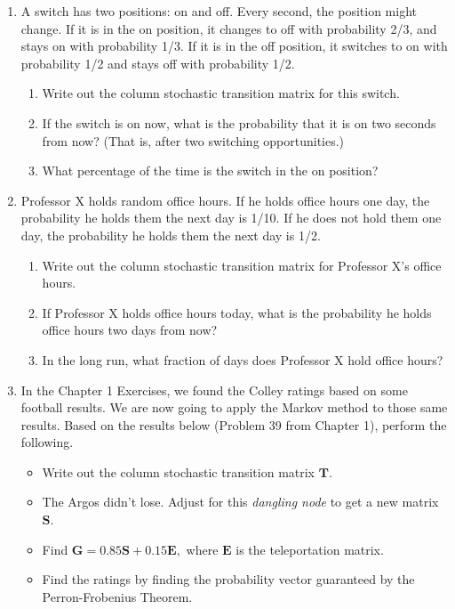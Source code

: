 \documentclass[
]{book}
\providecommand{\tightlist}{%
  \setlength{\itemsep}{0pt}\setlength{\parskip}{0pt}}
\theoremstyle{definition}
\theoremstyle{definition}
\theoremstyle{definition}
\theoremstyle{definition}
\theoremstyle{remark}
\begin{document}
\begin{enumerate}
\def\labelenumi{\arabic{enumi}.}
\setcounter{enumi}{26}
\tightlist
\item
  A switch has two positions: on and off. Every second, the position might change. If it is in the on position, it changes to off with probability 2/3, and stays on with probability 1/3. If it is in the off position, it switches to on with probability 1/2 and stays off with probability 1/2.

  \begin{enumerate}
  \def\labelenumii{\alph{enumii}.}
  \tightlist
  \item
    Write out the column stochastic transition matrix for this switch.
  \item
    If the switch is on now, what is the probability that it is on two seconds from now? (That is, after two switching opportunities.)
  \item
    What percentage of the time is the switch in the on position?
  \end{enumerate}
\item
  Professor X holds random office hours. If he holds office hours one day, the probability he holds them the next day is 1/10. If he does not hold them one day, the probability he holds them the next day is 1/2.

  \begin{enumerate}
  \def\labelenumii{\alph{enumii}.}
  \tightlist
  \item
    Write out the column stochastic transition matrix for Professor X's office hours.
  \item
    If Professor X holds office hours today, what is the probability he holds office hours two days from now?
  \item
    In the long run, what fraction of days does Professor X hold office hours?
  \end{enumerate}
\item
  In the Chapter 1 Exercises, we found the Colley ratings based on some football results. We are now going to apply the Markov method to those same results. Based on the results below (Problem 39 from Chapter 1), perform the following.

  \begin{itemize}
  \tightlist
  \item
    Write out the column stochastic transition matrix \(\mathbf{T}.\)
  \item
    The Argos didn't lose. Adjust for this \emph{dangling node} to get a new matrix \(\mathbf{S}.\)
  \item
    Find \(\mathbf{G}=0.85\mathbf{S}+0.15\mathbf{E},\) where \(\mathbf{E}\) is the teleportation matrix.
  \item
    Find the ratings by finding the probability vector guaranteed by the Perron-Frobenius Theorem.
  \end{itemize}
\end{enumerate}
\end{document}
